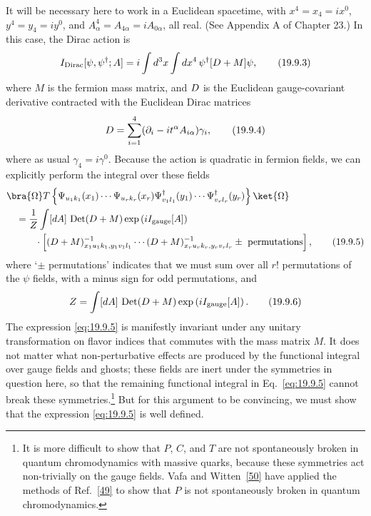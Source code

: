 It will be necessary here to work in a Euclidean spacetime, with $x^4=x_4=ix^0$, $y^4=y_4=iy^0$, and $A^4_\alpha=A_{4\alpha}=iA_{0\alpha}$, all real. (See Appendix A of Chapter 23.) In this case, the Dirac action is
\begin{equation}
I_{\mathrm{Dirac}}[\psi,\psi^\dagger;A]
=i\int d^3x\int dx^4\,
\psi^\dagger[\sl{D}+M]\psi,
\tag{19.9.3}\label{eq:19.9.3}
\end{equation}
where $M$ is the fermion mass matrix, and $\sl{D}$ is the Euclidean gauge-covariant derivative contracted with the Euclidean Dirac matrices
\begin{equation}
\sl{D}
=\sum_{i=1}^4(\partial_i-it^\alpha A_{i\alpha})\gamma_i,
\tag{19.9.4}\label{eq:19.9.4}
\end{equation}
where as usual $\gamma_4=i\gamma^0$. Because the action is quadratic in fermion fields, we can explicitly perform the integral over these fields
\begin{align}
&\bra{\Omega}T\left\{
\Psi_{u_1k_1}(x_1)\cdots\Psi_{u_rk_r}(x_r)
\Psi^\dagger_{v_1l_1}(y_1)\cdots\Psi^\dagger_{v_rl_r}(y_r)
\right\}\ket{\Omega}
\notag\\
&\quad=\frac{1}{Z}\int[dA]\,
\operatorname{Det}(\sl{D}+M)
\exp\left(iI_{\mathrm{gauge}}[A]\right)
\notag\\
&\qquad\quad{}\cdot
\left[
(\sl{D}+M)^{-1}_{x_1u_1k_1,y_1v_1l_1}
\cdots
(\sl{D}+M)^{-1}_{x_ru_rk_r,y_rv_rl_r}
\mathbin{\pm}\text{ permutations}
\right],
\tag{19.9.5}\label{eq:19.9.5}
\end{align}
where `$\mathbin{\pm}$ permutations' indicates that we must sum over all $r!$ permutations of the $\psi$ fields, with a minus sign for odd permutations, and
\begin{equation}
Z=\int[dA]\,
\operatorname{Det}(\sl{D}+M)
\exp\left(iI_{\mathrm{gauge}}[A]\right).
\tag{19.9.6}\label{eq:19.9.6}
\end{equation}
The expression \eqref{eq:19.9.5} is manifestly invariant under any unitary transformation on flavor indices that commutes with the mass matrix $M$. It does not matter what non-perturbative effects are produced by the functional integral over gauge fields and ghosts; these fields are inert under the symmetries in question here, so that the remaining functional integral in Eq.~\eqref{eq:19.9.5} cannot break these symmetries.\footnote{It is more difficult to show that $P$, $C$, and $T$ are not spontaneously broken in quantum chromodynamics with massive quarks, because these symmetries act non-trivially on the gauge fields. Vafa and Witten~\hyperref[ch19-ref-50]{[50]} have applied the methods of Ref.~\hyperref[ch19-ref-49]{[49]} to show that $P$ is not spontaneously broken in quantum chromodynamics.} But for this argument to be convincing, we must show that the expression \eqref{eq:19.9.5} is well defined.

